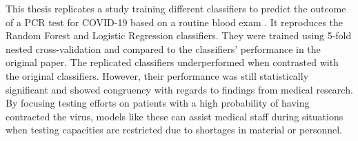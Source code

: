 This thesis replicates a study training different classifiers to predict the 
outcome of a PCR test for COVID-19 based on a routine blood exam \cite{RN127}. 
It reproduces the Random Forest and Logistic Regression classifiers. They were 
trained using 5-fold nested cross-validation and compared to the classifiers' 
performance in the original paper. The replicated classifiers underperformed 
when contrasted with the original classifiers. However, their performance was 
still statistically significant and showed congruency with regards to findings 
from medical research. By focusing testing efforts on patients with a high 
probability of having contracted the virus, models like these can assist 
medical staff during situations when testing capacities are restricted due to 
shortages in material or personnel.
